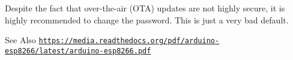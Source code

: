 
\begin{DoxyRefList}
\item[\label{todo__todo000001}%
\hypertarget{todo__todo000001}{}%
Member \hyperlink{WIFIOnOff_8ino_afc670eb8e8858f7ddbbecf997a99dbca}{D\-E\-V\-\_\-\-O\-T\-A\-\_\-\-P\-A\-S\-S\-W\-D} ]Despite the fact that over-\/the-\/air (O\-T\-A) updates are not highly secure, it is highly recommended to change the password. This is just a very bad default. \begin{DoxySeeAlso}{See Also}
\href{https://media.readthedocs.org/pdf/arduino-esp8266/latest/arduino-esp8266.pdf}{\tt https\-://media.\-readthedocs.\-org/pdf/arduino-\/esp8266/latest/arduino-\/esp8266.\-pdf} 
\end{DoxySeeAlso}

\end{DoxyRefList}